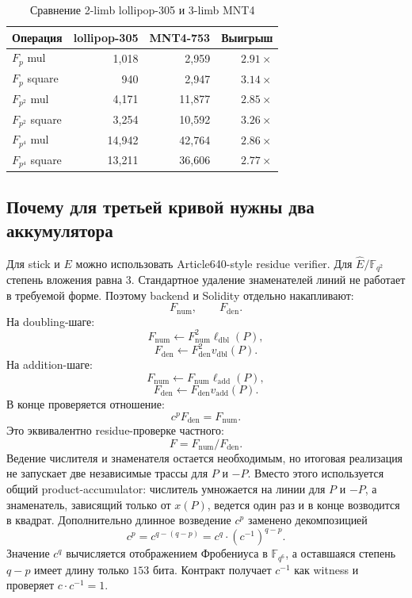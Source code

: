 \documentclass[12pt,a4paper]{article}
\begin{document}
\begin{table}[htbp]
\centering
\caption{Сравнение 2-limb lollipop-305 и 3-limb MNT4}
\small
\begin{tabular}{l r r r}
\toprule
Операция & lollipop-305 & MNT4-753 & Выигрыш \\
\midrule
$F_p$ mul & 1,018 & 2,959 & $2.91\times$ \\
$F_p$ square & 940 & 2,947 & $3.14\times$ \\
$F_{p^2}$ mul & 4,171 & 11,877 & $2.85\times$ \\
$F_{p^2}$ square & 3,254 & 10,592 & $3.26\times$ \\
$F_{p^4}$ mul & 14,942 & 42,764 & $2.86\times$ \\
$F_{p^4}$ square & 13,211 & 36,606 & $2.77\times$ \\
\bottomrule
\end{tabular}
\end{table}

\subsection{Почему для третьей кривой нужны два аккумулятора}

Для stick и $E$ можно использовать Article640-style residue verifier. Для
$\widehat{E}/\mathbb{F}_{q^2}$ степень вложения равна $3$. Стандартное удаление
знаменателей линий не работает в требуемой форме. Поэтому backend и Solidity
отдельно накапливают:
\[
    F_{\mathrm{num}},\qquad F_{\mathrm{den}}.
\]
На doubling-шаге:
\[
    F_{\mathrm{num}}\leftarrow
    F_{\mathrm{num}}^2\ell_{\mathrm{dbl}}(P),
\]
\[
    F_{\mathrm{den}}\leftarrow
    F_{\mathrm{den}}^2v_{\mathrm{dbl}}(P).
\]
На addition-шаге:
\[
    F_{\mathrm{num}}\leftarrow
    F_{\mathrm{num}}\ell_{\mathrm{add}}(P),
\]
\[
    F_{\mathrm{den}}\leftarrow
    F_{\mathrm{den}}v_{\mathrm{add}}(P).
\]
В конце проверяется отношение:
\[
    c^p F_{\mathrm{den}}=F_{\mathrm{num}}.
\]
Это эквивалентно residue-проверке частного:
\[
    F=F_{\mathrm{num}}/F_{\mathrm{den}}.
\]
Ведение числителя и знаменателя остается необходимым, но итоговая реализация
не запускает две независимые трассы для $P$ и $-P$. Вместо этого используется
общий product-accumulator: числитель умножается на линии для $P$ и $-P$, а
знаменатель, зависящий только от $x(P)$, ведется один раз и в конце
возводится в квадрат. Дополнительно длинное возведение $c^p$ заменено
декомпозицией
\[
    c^p=c^{q-(q-p)}=c^q\cdot(c^{-1})^{q-p}.
\]
Значение $c^q$ вычисляется отображением Фробениуса в $\mathbb{F}_{q^6}$, а
оставшаяся степень $q-p$ имеет длину только $153$ бита. Контракт получает
$c^{-1}$ как witness и проверяет $c\cdot c^{-1}=1$.
\end{document}
